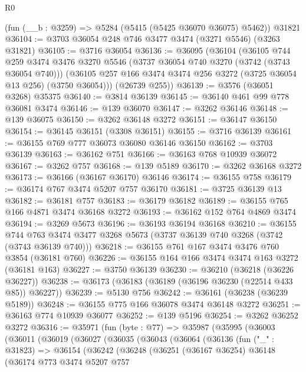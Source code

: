 \begin{lexlean}{R0}
\begin{coremodule}
    (fun (__b : @3259) => @5284 (@5415 (@5425 @36070 @36075) @5462))
    @31821
@36104 := @3703 @36054 @248 @746 @3477 @3474 (@3271 @5546) (@3263 @31821)
@36105 := @3716 @36054
@36136 := @36095
    (@36104
      (@36105
        @744
        @259
        @3474
        @3476
        @3270
        @5546
        (@3737 @36054 @740 @3270 (@3742 (@3743 @36054 @740)))
        (@36105 @257 @166 @3474 @3474 @256 @3272 (@3725 @36054 @13 @256) (@3750 @36054)))
      (@26739 @255))
@36139 := @3576 (@36051 @3268) @35375
@36140 := @3814 @36139
@36145 := @36140 @461 @99 @778 @36081 @3474
@36146 := @139 @36070
@36147 := @3262 @36146
@36148 := @139 @36075
@36150 := @3262 @36148 @3272
@36151 := @36147 @36150
@36154 := @36145 @36151 (@3308 @36151)
@36155 := @3716 @36139
@36161 := @36155 @769 @777 @36073 @36080 @36146 @36150
@36162 := @3703 @36139
@36163 := @36162 @751
@36166 := @36163 @768 @10939 @36072
@36167 := @3262 @757
@36168 := @139 @5189
@36170 := @3262 @36168 @3272
@36173 := @36166 (@36167 @36170) @36146
@36174 := @36155 @758
@36179 := @36174 @767 @3474 @5207 @757 @36170
@36181 := @3725 @36139 @13
@36182 := @36181 @757
@36183 := @36179 @36182
@36189 := @36155 @765 @166 @4871 @3474 @36168 @3272
@36193 := @36162 @152 @764 @4869 @3474
@36194 := @3269 @5673
@36196 := @36193 @36194 @36168
@36210 := @36155
    @744
    @763
    @3474
    @3477
    @3268
    @5673
    (@3737 @36139 @740 @3268 (@3742 (@3743 @36139 @740)))
@36218 := @36155 @761 @167 @3474 @3476 @760 @3854 (@36181 @760)
@36226 := @36155 @164 @166 @3474 @3474 @163 @3272 (@36181 @163)
@36227 := @3750 @36139
@36230 := @36210 (@36218 (@36226 @36227))
@36238 := @36173 (@36183 (@36189 (@36196 @36230 (@22514 @433 @85)) @36227))
@36239 := @5130 @756
@36242 := @36161 (@36238 (@36239 @5189))
@36248 := @36155 @775 @166 @36078 @3474 @36148 @3272
@36251 := @36163 @774 @10939 @36077
@36252 := @139 @5196
@36254 := @3262 @36252 @3272
@36316 := @35971
    (fun (byte : @77) =>
    @35987
      (@35995
        (@36003
          (@36011
            (@36019
              (@36027
                (@36035
                  (@36043
                    (@36064
                      (@36136
                        (fun ("_" : @31823) =>
                        @36154
                          (@36242
                            (@36248
                              (@36251
                                (@36167 @36254)
                                @36148
                                (@36174
                                  @773
                                  @3474
                                  @5207
                                  @757

\end{coremodule}
\end{lexlean}
